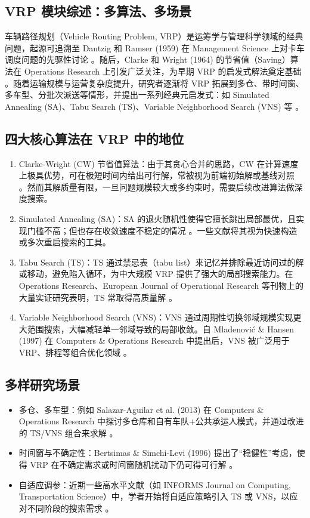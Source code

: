 \documentclass[12pt,a4paper,twoside]{ctexbook}
\begin{document}
\subsection{VRP 模块综述：多算法、多场景}
车辆路径规划（Vehicle Routing Problem, VRP）是运筹学与管理科学领域的经典问题，起源可追溯至 Dantzig 和 Ramser (1959) 在 Management Science 上对卡车调度问题的先驱性讨论 \cite{1}。随后，Clarke 和 Wright (1964) 的节省值（Saving）算法在 Operations Research 上引发广泛关注，为早期 VRP 的启发式解法奠定基础 \cite{2}。随着运输规模与运营复杂度提升，研究者逐渐将 VRP 拓展到多仓、带时间窗、多车型、分批次派送等情形，并提出一系列经典元启发式：如 Simulated Annealing (SA)、Tabu Search (TS)、Variable Neighborhood Search (VNS) 等 \cite{3,4,5}。

\subsection{四大核心算法在 VRP 中的地位}

\begin{enumerate}
    \item Clarke-Wright (CW) 节省值算法：由于其贪心合并的思路，CW 在计算速度上极具优势，可在极短时间内给出可行解，常被视为前端初始解或基线对照 \cite{2}。然而其解质量有限，一旦问题规模较大或多约束时，需要后续改进算法做深度搜索。
    \item Simulated Annealing (SA)：SA 的退火随机性使得它擅长跳出局部最优，且实现门槛不高；但也存在收敛速度不稳定的情况 \cite{3}。一些文献将其视为快速构造或多次重启搜索的工具。
    \item Tabu Search (TS)：TS 通过禁忌表（tabu list）来记忆并排除最近访问过的解或移动，避免陷入循环，为中大规模 VRP 提供了强大的局部搜索能力。在 Operations Research、European Journal of Operational Research 等刊物上的大量实证研究表明，TS 常取得高质量解 \cite{4,6}。
    \item Variable Neighborhood Search (VNS)：VNS 通过周期性切换邻域规模实现更大范围搜索，大幅减轻单一邻域导致的局部收敛。自 Mladenović \& Hansen (1997) 在 Computers \& Operations Research 中提出后，VNS 被广泛用于 VRP、排程等组合优化领域 \cite{5}。
\end{enumerate}

\subsection{多样研究场景}
\begin{itemize}
    \item 多仓、多车型：例如 Salazar-Aguilar et al. (2013) 在 Computers \& Operations Research 中探讨多仓库和自有车队+公共承运人模式，并通过改进的 TS/VNS 组合来求解 \cite{7}。
    \item 时间窗与不确定性：Bertsimas \& Simchi-Levi (1996) 提出了“稳健性”考虑，使得 VRP 在不确定需求或时间窗随机扰动下仍可得可行解 \cite{8}。
    \item 自适应调参：近期一些高水平文献（如 INFORMS Journal on Computing, Transportation Science）中，学者开始将自适应策略引入 TS 或 VNS，以应对不同阶段的搜索需求 \cite{9,10}。
\end{itemize}
\end{document}
